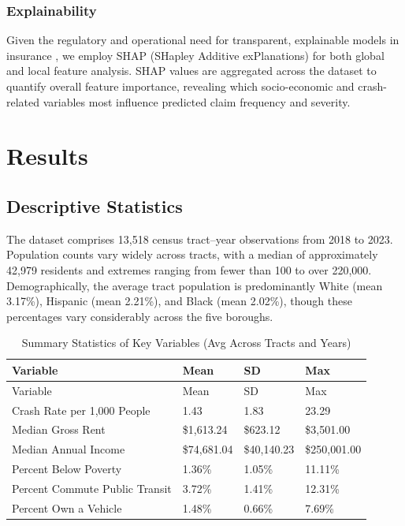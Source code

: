\documentclass[
  number,
  review,
  3p]{elsarticle}
\begin{document}
\subsubsection{Explainability}\label{explainability}

Given the regulatory and operational need for transparent, explainable
models in insurance \citep{henckaerts, lundberg}, we employ SHAP
(SHapley Additive exPlanations) for both global and local feature
analysis. SHAP values are aggregated across the dataset to quantify
overall feature importance, revealing which socio-economic and
crash-related variables most influence predicted claim frequency and
severity.

\section{Results}\label{results}

\subsection{\texorpdfstring{\textbf{Descriptive
Statistics}}{Descriptive Statistics}}\label{descriptive-statistics}

The dataset comprises 13,518 census tract--year observations from 2018
to 2023. Population counts vary widely across tracts, with a median of
approximately 42,979 residents and extremes ranging from fewer than 100
to over 220,000. Demographically, the average tract population is
predominantly White (mean 3.17\%), Hispanic (mean 2.21\%), and Black
(mean 2.02\%), though these percentages vary considerably across the
five boroughs.

\begin{longtable}[]{@{}llll@{}}
\caption{Summary Statistics of Key Variables (Avg Across Tracts and
Years)}\tabularnewline
\toprule\noalign{}
Variable & Mean & SD & Max \\
\midrule\noalign{}
\endfirsthead
\toprule\noalign{}
Variable & Mean & SD & Max \\
\midrule\noalign{}
\endhead
\bottomrule\noalign{}
\endlastfoot
Crash Rate per 1,000 People & 1.43 & 1.83 & 23.29 \\
Median Gross Rent & \$1,613.24 & \$623.12 & \$3,501.00 \\
Median Annual Income & \$74,681.04 & \$40,140.23 & \$250,001.00 \\
Percent Below Poverty & 1.36\% & 1.05\% & 11.11\% \\
Percent Commute Public Transit & 3.72\% & 1.41\% & 12.31\% \\
Percent Own a Vehicle & 1.48\% & 0.66\% & 7.69\% \\
\end{longtable}
\end{document}
